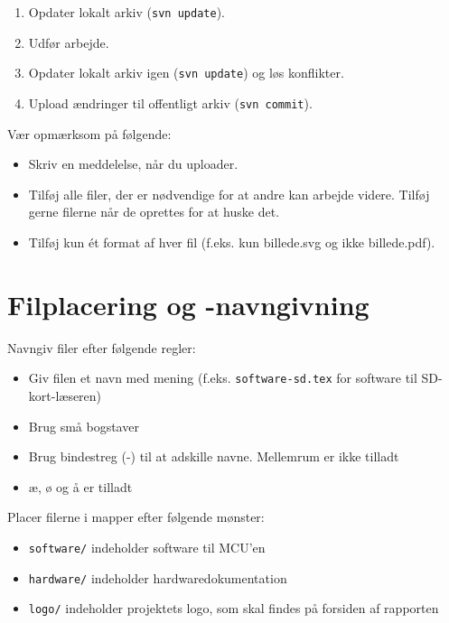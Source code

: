 \documentclass[simple,final]{../mypaper}
\begin{document}
\begin{enumerate}
\item Opdater lokalt arkiv (\texttt{svn update}).
\item Udfør arbejde.
\item Opdater lokalt arkiv igen (\texttt{svn update}) og løs
  konflikter.
\item Upload ændringer til offentligt arkiv (\texttt{svn commit}).
\end{enumerate}

Vær opmærksom på følgende:

\begin{itemize}
\item Skriv en meddelelse, når du uploader.
\item Tilføj alle filer, der er nødvendige for at andre kan arbejde
  videre. Tilføj gerne filerne når de oprettes for at huske det.
\item Tilføj kun ét format af hver fil (f.eks. kun billede.svg og ikke
  billede.pdf).
\end{itemize}


\section{Filplacering og -navngivning}

Navngiv filer efter følgende regler:

\begin{itemize}
\item Giv filen et navn med mening
  (f.eks. \texttt{software-sd.tex} for software til
  SD-kort-læseren)
\item Brug små bogstaver
\item Brug bindestreg (-) til at adskille navne. Mellemrum er ikke tilladt
\item æ, ø og å er tilladt
\end{itemize}

Placer filerne i mapper efter følgende mønster:

\begin{itemize}
\item \texttt{software/} indeholder software til MCU'en
\item \texttt{hardware/} indeholder hardwaredokumentation
\item \texttt{logo/} indeholder projektets logo, som skal findes på
  forsiden af rapporten
\end{itemize}
\end{document}
